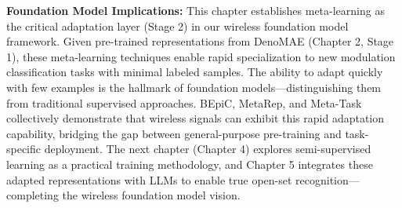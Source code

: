 \textbf{Foundation Model Implications:} This chapter establishes meta-learning as the critical adaptation layer (Stage 2) in our wireless foundation model framework. Given pre-trained representations from DenoMAE (Chapter 2, Stage 1), these meta-learning techniques enable rapid specialization to new modulation classification tasks with minimal labeled samples. The ability to adapt quickly with few examples is the hallmark of foundation models—distinguishing them from traditional supervised approaches. BEpiC, MetaRep, and Meta-Task collectively demonstrate that wireless signals can exhibit this rapid adaptation capability, bridging the gap between general-purpose pre-training and task-specific deployment. The next chapter (Chapter 4) explores semi-supervised learning as a practical training methodology, and Chapter 5 integrates these adapted representations with LLMs to enable true open-set recognition—completing the wireless foundation model vision.
